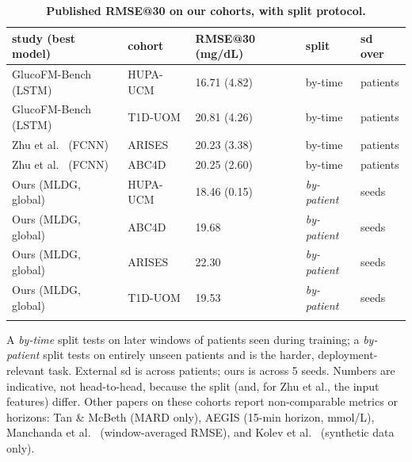 \documentclass[10pt,letterpaper]{article}
\newlength\savedwidth
\newcommand\thickhline{\noalign{\global\savedwidth\arrayrulewidth\global\arrayrulewidth 2pt}%
\hline
\noalign{\global\arrayrulewidth\savedwidth}}
\begin{document}
\begin{table}[!ht]
\centering
\captionsetup{justification=centering,singlelinecheck=on}
\caption{\bf Published RMSE@30 on our cohorts, with split protocol.}
\label{tab:prior}
\begin{tabular}{lllll}
\thickhline
study (best model) & cohort & RMSE@30 (mg/dL) & split & sd over \\
\hline
GlucoFM-Bench \cite{lu2026glucofmbench} (LSTM) & HUPA-UCM & 16.71 (4.82) & by-time & patients \\
GlucoFM-Bench \cite{lu2026glucofmbench} (LSTM) & T1D-UOM  & 20.81 (4.26) & by-time & patients \\
Zhu et al.\ \cite{zhu2023fcnn} (FCNN)          & ARISES   & 20.23 (3.38) & by-time & patients \\
Zhu et al.\ \cite{zhu2023fcnn} (FCNN)          & ABC4D    & 20.25 (2.60) & by-time & patients \\
\hline
Ours (MLDG, global)            & HUPA-UCM & 18.46 (0.15) & \emph{by-patient} & seeds \\
Ours (MLDG, global)            & ABC4D    & 19.68 & \emph{by-patient} & seeds \\
Ours (MLDG, global)            & ARISES   & 22.30 & \emph{by-patient} & seeds \\
Ours (MLDG, global)            & T1D-UOM  & 19.53 & \emph{by-patient} & seeds \\
\thickhline
\end{tabular}
\begin{center}
{\small A \emph{by-time} split tests on later windows of patients seen during
training; a \emph{by-patient} split tests on entirely unseen patients and is the
harder, deployment-relevant task. External sd is across patients; ours is across
5 seeds. Numbers are indicative, not head-to-head, because the split (and, for
Zhu et al., the input features) differ. Other papers on these cohorts report
non-comparable metrics or horizons: Tan \& McBeth \cite{tan2026uncertainty}
(MARD only), AEGIS \cite{pansheriya2026aegis} (15-min horizon, mmol/L),
Manchanda et al.\ \cite{manchanda2025lstm} (window-averaged RMSE), and Kolev
et al.\ \cite{kolev2026benchmark} (synthetic data only).}
\end{center}
\end{table}
\end{document}
